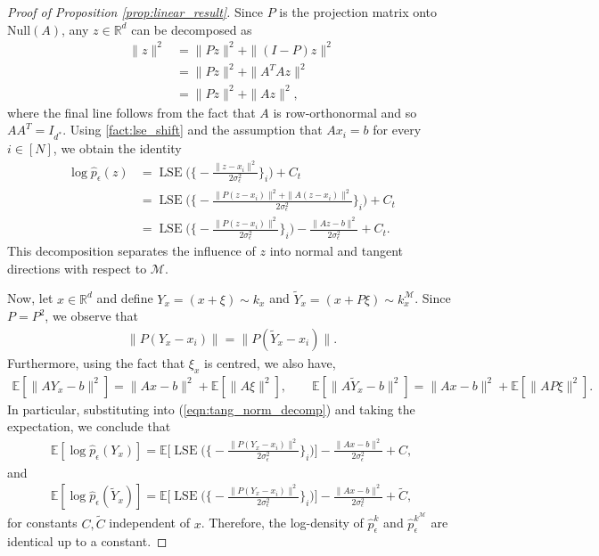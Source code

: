 \documentclass[10pt]{article}
\theoremstyle{plain}
\theoremstyle{definition}
\theoremstyle{remark}
\newcommand{\M}{{\mathcal{M}}}
\newcommand{\R}{\mathbb{R}}
\newcommand{\lse}{\operatorname{LSE}}
\newcommand{\E}{\mathbb{E}}
\begin{document}
\begin{proof}[Proof of Proposition \ref{prop:linear_result}]
Since $P$ is the projection matrix onto $\text{Null}(A)$, any $z \in \R^d$ can be decomposed as
\begin{align*}
    \|z\|^2 &= \|Pz\|^2 + \|(I - P)z\|^2\\
    &= \|Pz\|^2 + \|A^T Az\|^2\\
    &= \|Pz\|^2 + \|Az\|^2,
\end{align*}
where the final line follows from the fact that \(A\) is row-orthonormal and so \(A A^T = I_{d^*}\). Using \cref{fact:lse_shift} and the assumption that $Ax_i = b$ for every $i \in [N]$, we obtain the identity
\begin{align}
    \log \hat{p}_\epsilon(z) &= \lse \bigg ( \bigg \{ -\frac{\|z - x_i\|^2}{2 \sigma_\epsilon^2} \bigg\}_{i} \bigg ) + C_t\\
    &= \lse \bigg ( \bigg \{ -\frac{\|P(z - x_i)\|^2 + \|A(z - x_i)\|^2}{2 \sigma_\epsilon^2} \bigg\}_{i} \bigg ) + C_t\\
    &= \lse \bigg ( \bigg \{ -\frac{\|P(z - x_i)\|^2}{2 \sigma_\epsilon^2} \bigg\}_{i} \bigg )
    - \frac{\|Az - b\|^2}{2 \sigma_\epsilon^2} + C_t. \label{eqn:tang_norm_decomp}
\end{align}
This decomposition separates the influence of $z$ into normal and tangent directions with respect to $\M$.

Now, let \(x \in \R^d\) and define \(Y_x = (x + \xi) \sim k_x\) and \(\widetilde{Y}_x = (x + P\xi) \sim k_x^{\M}\). Since $P = P^2$, we observe that
\begin{align*}
    \|P(Y_x-x_i)\| = \|P(\tilde{Y}_x-x_i)\|.
\end{align*}
Furthermore, using the fact that \(\xi_x\) is centred, we also have,
\begin{align*}
    \E[\|AY_x - b\|^2] = \|Ax - b\|^2 + \E[\|A \xi\|^2], \qquad
    \E[\|A\tilde{Y}_x - b\|^2] = \|Ax - b\|^2 + \E[\|AP \xi\|^2].
\end{align*}
In particular, substituting into (\ref{eqn:tang_norm_decomp}) and taking the expectation, we conclude that
\begin{align*}
    \E[\log \hat{p}_\epsilon(Y_x)] = \E \bigg [ \lse \bigg ( \bigg \{ -\frac{\|P(Y_x - x_i)\|^2}{2 \sigma_\epsilon^2} \bigg\}_{i} \bigg ) \bigg ] - \frac{\|A x - b\|^2}{2 \sigma_\epsilon^2} + C,
\end{align*}
and
\begin{align*}
    \E[\log \hat{p}_\epsilon(\tilde{Y}_x)] = \E \bigg [ \lse \bigg ( \bigg \{ -\frac{\|P(Y_x - x_i)\|^2}{2 \sigma_\epsilon^2} \bigg\}_{i} \bigg ) \bigg ] - \frac{\|A x - b\|^2}{2 \sigma_\epsilon^2} + \tilde{C},
\end{align*}
for constants $C, \tilde{C}$ independent of $x$. Therefore, the log-density of \(\hat{p}^k_\epsilon\) and \(\hat{p}^{k^\M}_\epsilon\) are identical up to a constant.
\end{proof}
\end{document}
